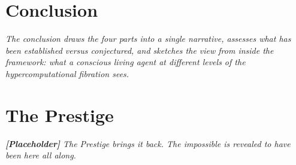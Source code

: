 \documentclass[12pt,openright,twoside]{book}
\theoremstyle{remark}
\theoremstyle{plain}
\theoremstyle{remark}
\theoremstyle{plain}
\theoremstyle{plain}
\begin{document}
\part*{Conclusion}

\vspace{1em}
\begin{mdframed}[backgroundcolor=remarkgray, linecolor=gray!60,
                 linewidth=1pt, topline=false, rightline=false,
                 bottomline=false]
\small\itshape
The conclusion draws the four parts into a single narrative,
assesses what has been established versus conjectured, and
sketches the view from inside the framework: what a conscious
living agent at different levels of the hypercomputational
fibration sees.
\end{mdframed}

\bigskip


\part{The Prestige}

\vspace{1em}
\begin{mdframed}[backgroundcolor=remarkgray, linecolor=gray!60,
                 linewidth=1pt, topline=false, rightline=false,
                 bottomline=false]
\small\itshape
\textbf{[Placeholder]} The Prestige brings it back.
The impossible is revealed to have been here all along.
\end{mdframed}

\bigskip


\cleardoublepage
{}
{}

\end{document}
